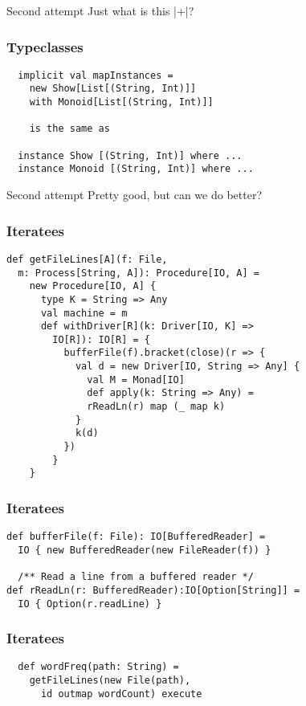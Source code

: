 \documentclass{beamer}
\begin{document}
\begin{frame}{Second attempt}
  Just what is this |+|?
\end{frame}

\begin{frame}[fragile]
\frametitle{Typeclasses}
\begin{lstlisting}
  implicit val mapInstances =
    new Show[List[(String, Int)]]
    with Monoid[List[(String, Int)]]

    is the same as

  instance Show [(String, Int)] where ...
  instance Monoid [(String, Int)] where ...
\end{lstlisting}
\end{frame}

\begin{frame}{Second attempt}
  Pretty good, but can we do better?
\end{frame}

\begin{frame}[fragile]
\frametitle{Iteratees}
\begin{lstlisting}
def getFileLines[A](f: File,
  m: Process[String, A]): Procedure[IO, A] =
    new Procedure[IO, A] {
      type K = String => Any
      val machine = m
      def withDriver[R](k: Driver[IO, K] =>
        IO[R]): IO[R] = {
          bufferFile(f).bracket(close)(r => {
            val d = new Driver[IO, String => Any] {
              val M = Monad[IO]
              def apply(k: String => Any) =
              rReadLn(r) map (_ map k)
            }
            k(d)
          })
        }
    }
\end{lstlisting}
\end{frame}

\begin{frame}[fragile]
\frametitle{Iteratees}
\begin{lstlisting}
def bufferFile(f: File): IO[BufferedReader] =
  IO { new BufferedReader(new FileReader(f)) }

  /** Read a line from a buffered reader */
def rReadLn(r: BufferedReader):IO[Option[String]] =
  IO { Option(r.readLine) }
\end{lstlisting}
\end{frame}

\begin{frame}[fragile]
\frametitle{Iteratees}
\begin{lstlisting}
  def wordFreq(path: String) =
    getFileLines(new File(path),
      id outmap wordCount) execute
\end{lstlisting}
\end{frame}
\end{document}
